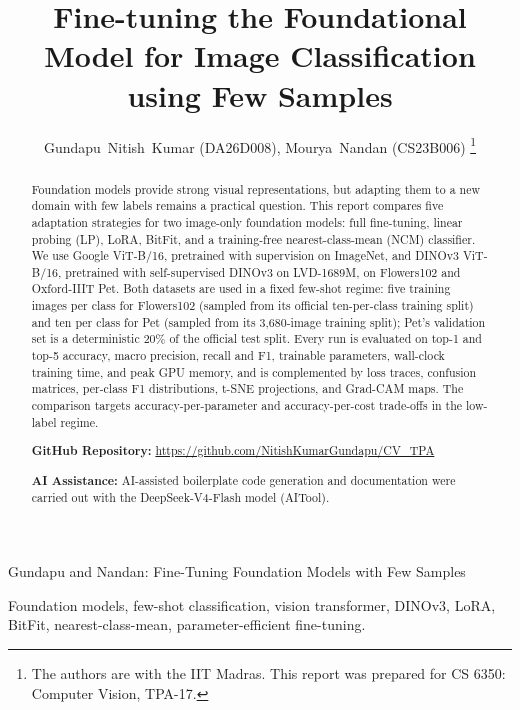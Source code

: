 \documentclass[journal,11pt]{IEEEtran}
\begin{document}
\title{Fine-tuning the Foundational Model for Image Classification using Few Samples}

\author{Gundapu~Nitish~Kumar (DA26D008), Mourya~Nandan (CS23B006)%
\thanks{The authors are with the IIT Madras. This report was prepared for CS 6350: Computer Vision, TPA-17.}}

%
{Gundapu and Nandan: Fine-Tuning Foundation Models with Few Samples}


\maketitle

\begin{abstract}
Foundation models provide strong visual representations, but adapting them to a new domain with few labels remains a practical question. This report compares five adaptation strategies for two image-only foundation models: full fine-tuning, linear probing (LP), LoRA, BitFit, and a training-free nearest-class-mean (NCM) classifier. We use Google ViT-B/16, pretrained with supervision on ImageNet, and DINOv3 ViT-B/16, pretrained with self-supervised DINOv3 on LVD-1689M, on Flowers102 and Oxford-IIIT Pet. Both datasets are used in a fixed few-shot regime: five training images per class for Flowers102 (sampled from its official ten-per-class training split) and ten per class for Pet (sampled from its 3{,}680-image training split); Pet's validation set is a deterministic 20\% of the official test split. Every run is evaluated on top-1 and top-5 accuracy, macro precision, recall and F1, trainable parameters, wall-clock training time, and peak GPU memory, and is complemented by loss traces, confusion matrices, per-class F1 distributions, t-SNE projections, and Grad-CAM maps. The comparison targets accuracy-per-parameter and accuracy-per-cost trade-offs in the low-label regime.

\medskip
\noindent \textbf{GitHub Repository:} \url{https://github.com/NitishKumarGundapu/CV_TPA}

\medskip
\noindent \textbf{AI Assistance:} AI-assisted boilerplate code generation and documentation were carried out with the DeepSeek-V4-Flash model (AITool).
\end{abstract}  

\begin{IEEEkeywords}
Foundation models, few-shot classification, vision transformer, DINOv3, LoRA, BitFit, nearest-class-mean, parameter-efficient fine-tuning.
\end{IEEEkeywords}
\end{document}
